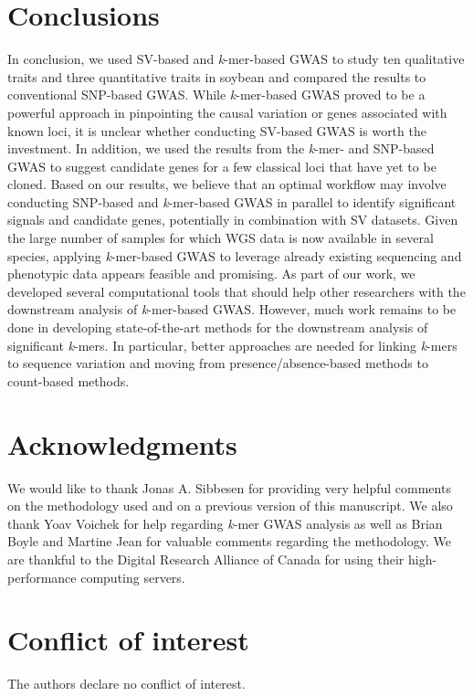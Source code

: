\documentclass{article}
\begin{document}
\clearpage

\section*{Conclusions}

In conclusion, we used SV-based and \emph{k}-mer-based GWAS to study ten
qualitative traits and three quantitative traits in soybean and
compared the results to conventional SNP-based GWAS. While \emph{k}-mer-based
GWAS proved to be a powerful approach in pinpointing the causal variation or
genes associated with known loci, it is unclear whether conducting SV-based
GWAS is worth the investment. In addition, we used the results from the
\emph{k}-mer- and SNP-based GWAS to suggest candidate genes for a few classical
loci that have yet to be cloned. Based on our results, we believe that an
optimal workflow may involve conducting SNP-based and \emph{k}-mer-based GWAS
in parallel to identify significant signals and candidate genes, potentially in
combination with SV datasets. Given the large number of samples for which WGS
data is now available in several species, applying \emph{k}-mer-based GWAS to
leverage already existing sequencing and phenotypic data appears feasible and
promising.  As part of our work, we developed several computational tools that
should help other researchers with the downstream analysis of
\emph{k}-mer-based GWAS. However, much work remains to be done in
developing state-of-the-art methods for the downstream analysis of significant
\emph{k}-mers. In particular, better approaches are needed for linking
\emph{k}-mers to sequence variation and moving from presence/absence-based
methods to count-based methods.

\clearpage

\section*{Acknowledgments}

We would like to thank Jonas A. Sibbesen for providing very helpful comments
on the methodology used and on a previous version of this manuscript.
We also thank Yoav Voichek for help regarding \textit{k}-mer GWAS
analysis as well as Brian Boyle and Martine Jean for valuable comments
regarding the methodology. We are thankful to the Digital Research Alliance of
Canada for using their high-performance computing servers.

\section*{Conflict of interest}
The authors declare no conflict of interest.
\end{document}
